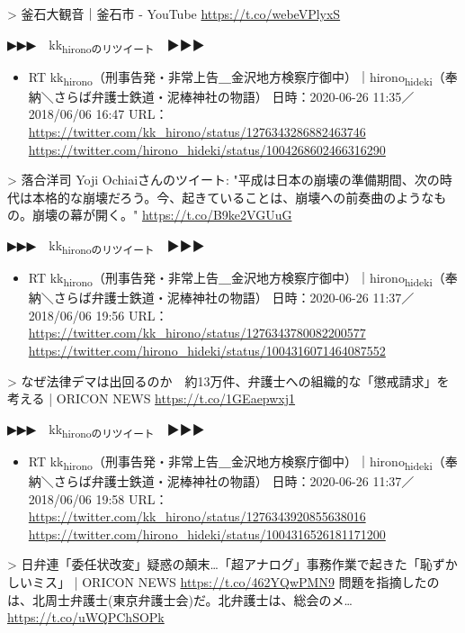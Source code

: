 \documentclass[]{ltjarticle}
\begin{document}
> 釜石大観音｜釜石市 - YouTube \url{https://t.co/webeVPlyxS}  

▶▶▶　kk\textsubscript{hironoのリツイート}　▶▶▶  

\begin{itemize}
\item RT kk\textsubscript{hirono}（刑事告発・非常上告＿金沢地方検察庁御中）｜hirono\textsubscript{hideki}（奉納＼さらば弁護士鉄道・泥棒神社の物語） 日時：2020-06-26 11:35／2018/06/06 16:47 URL： \url{https://twitter.com/kk\_hirono/status/1276343286882463746} \url{https://twitter.com/hirono\_hideki/status/1004268602466316290}
\end{itemize}

> 落合洋司 Yoji Ochiaiさんのツイート: "平成は日本の崩壊の準備期間、次の時代は本格的な崩壊だろう。今、起きていることは、崩壊への前奏曲のようなもの。崩壊の幕が開く。" \url{https://t.co/B9ke2VGUuG}  

▶▶▶　kk\textsubscript{hironoのリツイート}　▶▶▶  

\begin{itemize}
\item RT kk\textsubscript{hirono}（刑事告発・非常上告＿金沢地方検察庁御中）｜hirono\textsubscript{hideki}（奉納＼さらば弁護士鉄道・泥棒神社の物語） 日時：2020-06-26 11:37／2018/06/06 19:56 URL： \url{https://twitter.com/kk\_hirono/status/1276343780082200577} \url{https://twitter.com/hirono\_hideki/status/1004316071464087552}
\end{itemize}

> なぜ法律デマは出回るのか　約13万件、弁護士への組織的な「懲戒請求」を考える | ORICON NEWS \url{https://t.co/1GEaepwxj1}  

▶▶▶　kk\textsubscript{hironoのリツイート}　▶▶▶  

\begin{itemize}
\item RT kk\textsubscript{hirono}（刑事告発・非常上告＿金沢地方検察庁御中）｜hirono\textsubscript{hideki}（奉納＼さらば弁護士鉄道・泥棒神社の物語） 日時：2020-06-26 11:37／2018/06/06 19:58 URL： \url{https://twitter.com/kk\_hirono/status/1276343920855638016} \url{https://twitter.com/hirono\_hideki/status/1004316526181171200}
\end{itemize}

> 日弁連「委任状改変」疑惑の顛末…「超アナログ」事務作業で起きた「恥ずかしいミス」 | ORICON NEWS \url{https://t.co/462YQwPMN9} 問題を指摘したのは、北周士弁護士(東京弁護士会)だ。北弁護士は、総会のメ… \url{https://t.co/uWQPChSOPk}  
\end{document}
